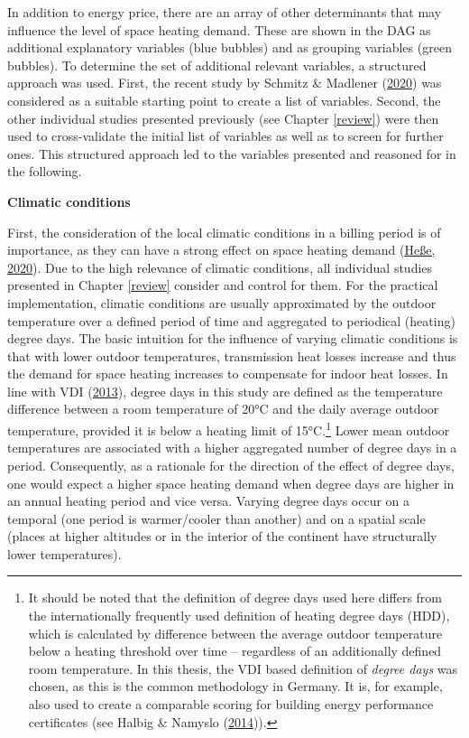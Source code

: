 \documentclass[12pt,twoside]{reedthesis}
\begin{document}
In addition to energy price, there are an array of other determinants that may influence the level of space heating demand. These are shown in the DAG as additional explanatory variables (blue bubbles) and as grouping variables (green bubbles). To determine the set of additional relevant variables, a structured approach was used. First, the recent study by Schmitz \& Madlener (\protect\hyperlink{ref-schmitz_madlener20}{2020}) was considered as a suitable starting point to create a list of variables. Second, the other individual studies presented previously (see Chapter \ref{review}) were then used to cross-validate the initial list of variables as well as to screen for further ones. This structured approach led to the variables presented and reasoned for in the following.

\textbf{Climatic conditions}

First, the consideration of the local climatic conditions in a billing period is of importance, as they can have a strong effect on space heating demand (\protect\hyperlink{ref-hesse20}{Heße, 2020}). Due to the high relevance of climatic conditions, all individual studies presented in Chapter \ref{review} consider and control for them. For the practical implementation, climatic conditions are usually approximated by the outdoor temperature over a defined period of time and aggregated to periodical (heating) degree days. The basic intuition for the influence of varying climatic conditions is that with lower outdoor temperatures, transmission heat losses increase and thus the demand for space heating increases to compensate for indoor heat losses. In line with VDI (\protect\hyperlink{ref-vdi13}{2013}), degree days in this study are defined as the temperature difference between a room temperature of 20°C and the daily average outdoor temperature, provided it is below a heating limit of 15°C.\footnote{It should be noted that the definition of degree days used here differs from the internationally frequently used definition of heating degree days (HDD), which is calculated by difference between the average outdoor temperature below a heating threshold over time -- regardless of an additionally defined room temperature. In this thesis, the VDI based definition of \emph{degree days} was chosen, as this is the common methodology in Germany. It is, for example, also used to create a comparable scoring for building energy performance certificates (see Halbig \& Namyslo (\protect\hyperlink{ref-halbig_namyslo14}{2014})).} Lower mean outdoor temperatures are associated with a higher aggregated number of degree days in a period. Consequently, as a rationale for the direction of the effect of degree days, one would expect a higher space heating demand when degree days are higher in an annual heating period and vice versa. Varying degree days occur on a temporal (one period is warmer/cooler than another) and on a spatial scale (places at higher altitudes or in the interior of the continent have structurally lower temperatures).
\end{document}
